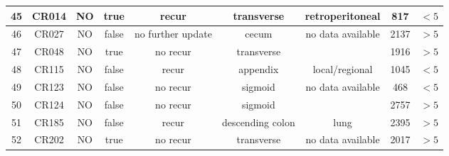 \begin{table}
\begin{longtable}{|c|c|c|c|c|c|c|c|c|}
\hline
45 & CR014 & NO & true & recur & transverse & retroperitoneal & 817 & $<5$ \\
\hline
46 &CR027 & NO & false & no further update  & cecum & no data available & 2137 & $>5$ \\
\hline
47 & CR048 & NO & true & no recur & transverse &   & 1916 & $>5$ \\
\hline
48 & CR115 & NO & false & recur & appendix & local/regional & 1045 & $<5$ \\
\hline
49 & CR123 & NO & false & no recur & sigmoid & no data available & 468 & $<5$ \\
\hline
50 & CR124 & NO & false & no recur & sigmoid &   & 2757 & $>5$ \\
\hline
51 & CR185 & NO & false & recur & descending colon & lung & 2395 & $>5$ \\
\hline
52 & CR202 & NO & true & no recur & transverse & no data available & 2017 & $>5$ \\
\hline
  \end{longtable}
\end{table}


% 

% 